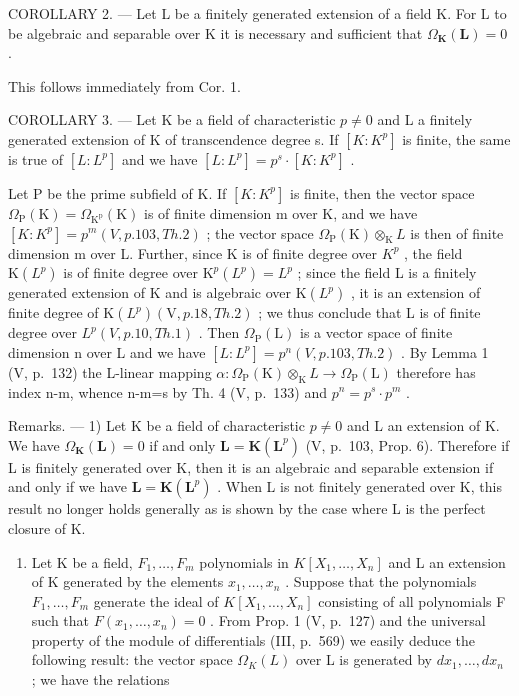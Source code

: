 COROLLARY 2. --- Let L be a finitely generated extension of a field K. For L to be algebraic and separable over K it is necessary and sufficient that \(\Omega_{\mathbf{K}}(\mathbf{L}) = 0\) .

This follows immediately from Cor. 1.

COROLLARY 3. --- Let K be a field of characteristic \(p \neq 0\) and L a finitely generated extension of K of transcendence degree s. If \([K:K^{p}]\) is finite, the same is true of \([L:L^{p}]\) and we have \([L:L^{p}] = p^{s} \cdot [K:K^{p}]\) .

Let P be the prime subfield of K. If \([K:K^{p}]\) is finite, then the vector space \(\Omega_{\mathrm{P}}(\mathrm{K})=\Omega_{\mathrm{K}^{\mathrm{p}}}\left(\mathrm{K}\right)\) is of finite dimension m over K, and we have \([K:K^{p}]=p^{m}(V,p.103,Th.2)\) ; the vector space \(\Omega_{\mathrm{P}}(\mathrm{K})\otimes_{\mathrm{K}}L\) is then of finite dimension m over L. Further, since K is of finite degree over \(K^{p}\) , the field \(\mathrm{K}(L^{p})\) is of finite degree over \(\mathrm{K}^{p}(L^{p})=L^{p}\) ; since the field L is a finitely generated extension of K and is algebraic over \(\mathrm{K}(L^{p})\) , it is an extension of finite degree of \(\mathrm{K}(L^{p})(\mathrm{V},p.18,Th.2)\) ; we thus conclude that L is of finite degree over \(L^{p}(V,p.10,Th.1)\) . Then \(\Omega_{\mathrm{P}}(\mathrm{L})\) is a vector space of finite dimension n over L and we have \([L:L^{p}]=p^{n}(V,p.103,Th.2)\) . By Lemma 1 (V, p.~132) the L-linear mapping \(\alpha:\Omega_{\mathrm{P}}(\mathrm{K})\otimes_{\mathrm{K}}L\to\Omega_{\mathrm{P}}(\mathrm{L})\) therefore has index n-m, whence n-m=s by Th. 4 (V, p.~133) and \(p^{n}=p^{s}\cdot p^{m}\) .

Remarks. --- 1) Let K be a field of characteristic \(p \neq 0\) and L an extension of K. We have \(\Omega_{\mathbf{K}}(\mathbf{L}) = 0\) if and only \(\mathbf{L} = \mathbf{K}(\mathbf{L}^p)\) (V, p.~103, Prop. 6). Therefore if L is finitely generated over K, then it is an algebraic and separable extension if and only if we have \(\mathbf{L} = \mathbf{K}(\mathbf{L}^p)\) . When L is not finitely generated over K, this result no longer holds generally as is shown by the case where L is the perfect closure of K.

\begin{enumerate}
\def\labelenumi{\arabic{enumi})}
\setcounter{enumi}{1}
\tightlist
\item
  Let K be a field, \(F_{1}, \ldots, F_{m}\) polynomials in \(K[X_{1}, \ldots, X_{n}]\) and L an extension of K generated by the elements \(x_{1}, \ldots, x_{n}\) . Suppose that the polynomials \(F_{1}, \ldots, F_{m}\) generate the ideal of \(K[X_{1}, \ldots, X_{n}]\) consisting of all polynomials F such that \(F(x_{1}, \ldots, x_{n}) = 0\) . From Prop. 1 (V, p.~127) and the universal property of the module of differentials (III, p.~569) we easily deduce the following result: the vector space \(\Omega_{K}(L)\) over L is generated by \(dx_{1}, \ldots, dx_{n}\) ; we have the relations
\end{enumerate}

